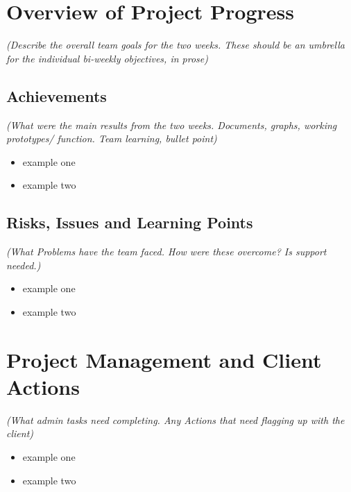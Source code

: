 \hypertarget{overview-of-project-progress}{%
\section{Overview of Project
Progress}\label{overview-of-project-progress}}

\emph{(Describe the overall team goals for the two weeks. These should
be an umbrella for the individual bi-weekly objectives, in prose)}

\hypertarget{achievements}{%
\subsection{Achievements}\label{achievements}}

\emph{(What were the main results from the two weeks. Documents, graphs,
working prototypes/ function. Team learning, bullet point)}

\begin{itemize}
\tightlist
\item
  example one
\item
  example two
\end{itemize}

\hypertarget{risks-issues-and-learning-points}{%
\subsection{Risks, Issues and Learning
Points}\label{risks-issues-and-learning-points}}

\emph{(What Problems have the team faced. How were these overcome? Is
support needed.)}

\begin{itemize}
\tightlist
\item
  example one
\item
  example two
\end{itemize}

\hypertarget{project-management-and-client-actions}{%
\section{Project Management and Client
Actions}\label{project-management-and-client-actions}}

\emph{(What admin tasks need completing. Any Actions that need flagging
up with the client)}

\begin{itemize}
\tightlist
\item
  example one
\item
  example two
\end{itemize}


